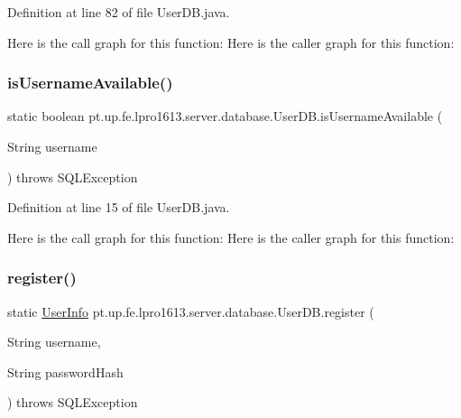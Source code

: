 Definition at line 82 of file User\+D\+B.\+java.

Here is the call graph for this function\+:
Here is the caller graph for this function\+:
\hypertarget{classpt_1_1up_1_1fe_1_1lpro1613_1_1server_1_1database_1_1_user_d_b_ab6501b54b7768d7d854a68dd9ed1b830}{}\label{classpt_1_1up_1_1fe_1_1lpro1613_1_1server_1_1database_1_1_user_d_b_ab6501b54b7768d7d854a68dd9ed1b830} 
\subsubsection{\texorpdfstring{is\+Username\+Available()}{isUsernameAvailable()}}
{\footnotesize\ttfamily static boolean pt.\+up.\+fe.\+lpro1613.\+server.\+database.\+User\+D\+B.\+is\+Username\+Available (\begin{DoxyParamCaption}\item[{String}]{username }\end{DoxyParamCaption}) throws S\+Q\+L\+Exception\hspace{0.3cm}{\ttfamily [static]}}



Definition at line 15 of file User\+D\+B.\+java.

Here is the call graph for this function\+:
Here is the caller graph for this function\+:
\hypertarget{classpt_1_1up_1_1fe_1_1lpro1613_1_1server_1_1database_1_1_user_d_b_a1bcefeca4058dd57c0d2c0a7387af2e1}{}\label{classpt_1_1up_1_1fe_1_1lpro1613_1_1server_1_1database_1_1_user_d_b_a1bcefeca4058dd57c0d2c0a7387af2e1} 
\subsubsection{\texorpdfstring{register()}{register()}}
{\footnotesize\ttfamily static \hyperlink{classpt_1_1up_1_1fe_1_1lpro1613_1_1sharedlib_1_1tuples_1_1_user_info}{User\+Info} pt.\+up.\+fe.\+lpro1613.\+server.\+database.\+User\+D\+B.\+register (\begin{DoxyParamCaption}\item[{String}]{username,  }\item[{String}]{password\+Hash }\end{DoxyParamCaption}) throws S\+Q\+L\+Exception\hspace{0.3cm}{\ttfamily [static]}}



